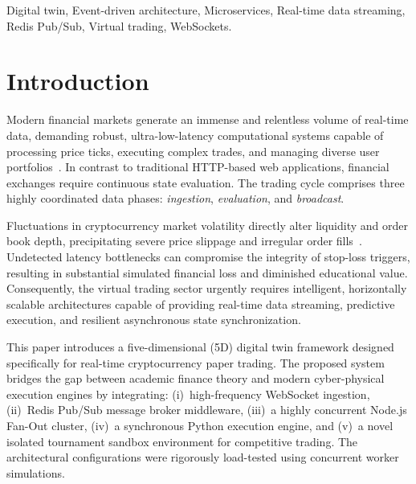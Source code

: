 \documentclass[conference]{IEEEtran}
\begin{document}
\begin{IEEEkeywords}
Digital twin, Event-driven architecture, Microservices, Real-time data streaming, Redis Pub/Sub, Virtual trading, WebSockets.
\end{IEEEkeywords}

\section{Introduction}

Modern financial markets generate an immense and relentless volume of real-time data, demanding robust, ultra-low-latency computational systems capable of processing price ticks, executing complex trades, and managing diverse user portfolios~\cite{kandalkar2023}. In contrast to traditional HTTP-based web applications, financial exchanges require continuous state evaluation. The trading cycle comprises three highly coordinated data phases: \textit{ingestion}, \textit{evaluation}, and \textit{broadcast}.

Fluctuations in cryptocurrency market volatility directly alter liquidity and order book depth, precipitating severe price slippage and irregular order fills~\cite{sereda2024}. Undetected latency bottlenecks can compromise the integrity of stop-loss triggers, resulting in substantial simulated financial loss and diminished educational value. Consequently, the virtual trading sector urgently requires intelligent, horizontally scalable architectures capable of providing real-time data streaming, predictive execution, and resilient asynchronous state synchronization.

This paper introduces a five-dimensional (5D) digital twin framework designed specifically for real-time cryptocurrency paper trading. The proposed system bridges the gap between academic finance theory and modern cyber-physical execution engines by integrating: (i)~high-frequency WebSocket ingestion, (ii)~Redis Pub/Sub message broker middleware, (iii)~a highly concurrent Node.js Fan-Out cluster, (iv)~a synchronous Python execution engine, and (v)~a novel isolated tournament sandbox environment for competitive trading. The architectural configurations were rigorously load-tested using concurrent worker simulations.
\end{document}
